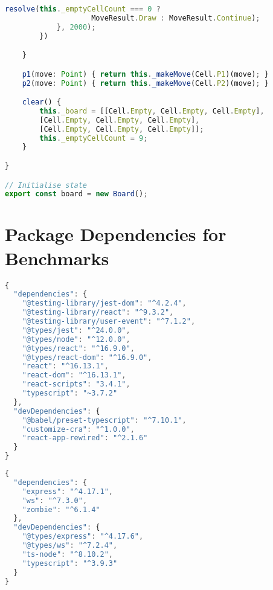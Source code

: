 \begin{lstlisting}[language=javascript,tabsize=2]
				resolve(this._emptyCellCount === 0 ? 
					MoveResult.Draw : MoveResult.Continue);
			}, 2000);
		})

	}

	p1(move: Point) { return this._makeMove(Cell.P1)(move); }
	p2(move: Point) { return this._makeMove(Cell.P2)(move); }

	clear() {
		this._board = [[Cell.Empty, Cell.Empty, Cell.Empty],
		[Cell.Empty, Cell.Empty, Cell.Empty],
		[Cell.Empty, Cell.Empty, Cell.Empty]];
		this._emptyCellCount = 9;
	}

}

// Initialise state
export const board = new Board();
\end{lstlisting}


\section{Package Dependencies for Benchmarks}
\label{section:evalbenchmarkpackagejson}

\begin{lstlisting}[language=javascript,tabsize=2,
title=Packages for Ping Pong Client]
{
  "dependencies": {
    "@testing-library/jest-dom": "^4.2.4",
    "@testing-library/react": "^9.3.2",
    "@testing-library/user-event": "^7.1.2",
    "@types/jest": "^24.0.0",
    "@types/node": "^12.0.0",
    "@types/react": "^16.9.0",
    "@types/react-dom": "^16.9.0",
    "react": "^16.13.1",
    "react-dom": "^16.13.1",
    "react-scripts": "3.4.1",
    "typescript": "~3.7.2"
  },
  "devDependencies": {
    "@babel/preset-typescript": "^7.10.1",
    "customize-cra": "^1.0.0",
    "react-app-rewired": "^2.1.6"
  }
}
\end{lstlisting}

\begin{lstlisting}[language=javascript,tabsize=2,
title=Packages for Ping Pong Server]
{
  "dependencies": {
    "express": "^4.17.1",
    "ws": "^7.3.0",
    "zombie": "^6.1.4"
  },
  "devDependencies": {
    "@types/express": "^4.17.6",
    "@types/ws": "^7.2.4",
    "ts-node": "^8.10.2",
    "typescript": "^3.9.3"
  }
}
\end{lstlisting}